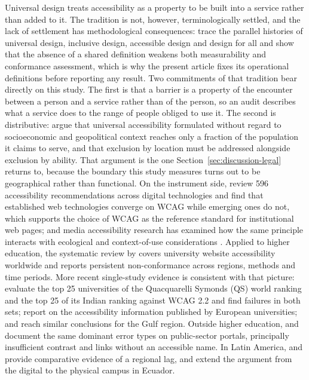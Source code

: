 \documentclass[]{interact}
\begin{document}
Universal design treats accessibility as a property to be built into a service rather than added to it. The tradition is not, however, terminologically settled, and the lack of settlement has methodological consequences: \citet{persson2015universal} trace the parallel histories of universal design, inclusive design, accessible design and design for all and show that the absence of a shared definition weakens both measurability and conformance assessment, which is why the present article fixes its operational definitions before reporting any result. Two commitments of that tradition bear directly on this study. The first is that a barrier is a property of the encounter between a person and a service rather than of the person, so an audit describes what a service does to the range of people obliged to use it. The second is distributive: \citet{abascal2016rethinking} argue that universal accessibility formulated without regard to socioeconomic and geopolitical context reaches only a fraction of the population it claims to serve, and that exclusion by location must be addressed alongside exclusion by ability. That argument is the one Section~\ref{sec:discussion-legal} returns to, because the boundary this study measures turns out to be geographical rather than functional. On the instrument side, \citet{etxabeantia2025characterisation} review 596 accessibility recommendations across digital technologies and find that established web technologies converge on WCAG while emerging ones do not, which supports the choice of WCAG as the reference standard for institutional web pages; and media accessibility research has examined how the same principle interacts with ecological and context-of-use considerations \citep{hermosaramirez2025universal}. Applied to higher education, the systematic review by \citet{campoverdemolina2023accessibility} covers university website accessibility worldwide and reports persistent non-conformance across regions, methods and time periods. More recent single-study evidence is consistent with that picture: \citet{krittika2025accessibility} evaluate the top 25 universities of the Quacquarelli Symonds (QS) world ranking and the top 25 of its Indian ranking against WCAG 2.2 and find failures in both sets; \citet{krejtz2025higher} report on the accessibility information published by European universities; and \citet{fakrudeen2025evaluation} reach similar conclusions for the Gulf region. Outside higher education, \citet{aljedaani2025egovernment} and \citet{iniesto2025service} document the same dominant error types on public-sector portals, principally insufficient contrast and links without an accessible name. In Latin America, \citet{acostavargas2020dataset} and \citet{acostavargas2020improve} provide comparative evidence of a regional lag, and \citet{maldonadogarces2025physical} extend the argument from the digital to the physical campus in Ecuador.
\end{document}
